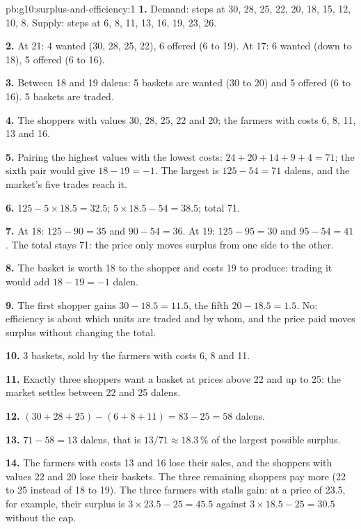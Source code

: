 \begin{solution}{pb:g10:surplus-and-efficiency:1}
\textbf{1.} Demand: steps at 30, 28, 25, 22, 20, 18, 15, 12, 10, 8. Supply: steps at 6, 8, 11, 13, 16, 19, 23, 26.

\textbf{2.} At 21: 4 wanted (30, 28, 25, 22), 6 offered (6 to 19). At 17: 6 wanted (down to 18), 5 offered (6 to 16).

\textbf{3.} Between 18 and 19 dalens: 5 baskets are wanted (30 to 20) and 5 offered (6 to 16). 5 baskets are traded.

\textbf{4.} The shoppers with values 30, 28, 25, 22 and 20; the farmers with costs 6, 8, 11, 13 and 16.

\textbf{5.} Pairing the highest values with the lowest costs: $24 + 20 + 14 + 9 + 4 = 71$; the sixth pair would give $18 - 19 = -1$. The largest  is
$125 - 54 = 71$ dalens, and the market's five trades reach it.

\textbf{6.}  $125 - 5 \times 18.5 = 32.5$;  $5 \times 18.5 - 54 = 38.5$; total 71.

\textbf{7.} At 18: $125 - 90 = 35$ and $90 - 54 = 36$. At 19: $125 - 95 = 30$ and $95 - 54 = 41$. The total stays 71: the price only moves surplus from one side
to the other.

\textbf{8.} The basket is worth 18 to the shopper and costs 19 to produce: trading it would add $18 - 19 = -1$ dalen.

\textbf{9.} The first shopper gains $30 - 18.5 = 11.5$, the fifth $20 - 18.5 = 1.5$. No: efficiency is about which units are traded and by whom, and the price paid
moves surplus without changing the total.

\textbf{10.} 3 baskets, sold by the farmers with costs 6, 8 and 11.

\textbf{11.} Exactly three shoppers want a basket at prices above 22 and up to 25: the market settles between 22 and 25 dalens.

\textbf{12.} $(30 + 28 + 25) - (6 + 8 + 11) = 83 - 25 = 58$ dalens.

\textbf{13.} $71 - 58 = 13$ dalens, that is $13/71 \approx 18.3\,\%$ of the largest possible surplus.

\textbf{14.} The farmers with costs 13 and 16 lose their sales, and the shoppers with values 22 and 20 lose their baskets. The three remaining shoppers pay more
(22 to 25 instead of 18 to 19). The three farmers with stalls gain: at a price of 23.5, for example, their surplus is $3 \times 23.5 - 25 = 45.5$ against $3
\times 18.5 - 25 = 30.5$ without the cap.


\end{solution}

